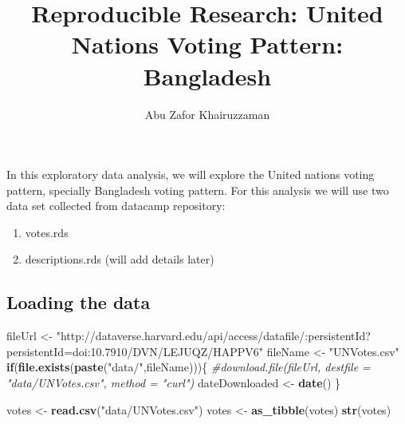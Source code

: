 \documentclass[
]{article}
\title{Reproducible Research: United Nations Voting Pattern: Bangladesh}
\author{Abu Zafor Khairuzzaman}
\date{}
\newenvironment{Shaded}{\begin{snugshade}}{\end{snugshade}}
\newcommand{\CommentTok}[1]{\textcolor[rgb]{0.56,0.35,0.01}{\textit{#1}}}
\newcommand{\ControlFlowTok}[1]{\textcolor[rgb]{0.13,0.29,0.53}{\textbf{#1}}}
\newcommand{\KeywordTok}[1]{\textcolor[rgb]{0.13,0.29,0.53}{\textbf{#1}}}
\newcommand{\NormalTok}[1]{#1}
\newcommand{\StringTok}[1]{\textcolor[rgb]{0.31,0.60,0.02}{#1}}
\providecommand{\tightlist}{%
  \setlength{\itemsep}{0pt}\setlength{\parskip}{0pt}}
\begin{document}
\maketitle

In this exploratory data analysis, we will explore the United nations
voting pattern, specially Bangladesh voting pattern. For this analysis
we will use two data set collected from datacamp repository:

\begin{enumerate}
\def\labelenumi{\arabic{enumi}.}
\tightlist
\item
  votes.rds
\item
  descriptions.rds (will add details later)
\end{enumerate}

\hypertarget{loading-the-data}{%
\subsection{Loading the data}\label{loading-the-data}}

\begin{Shaded}
\begin{Highlighting}[]
\NormalTok{fileUrl <-}\StringTok{ "http://dataverse.harvard.edu/api/access/datafile/:persistentId?persistentId=doi:10.7910/DVN/LEJUQZ/HAPPV6"}
\NormalTok{fileName <-}\StringTok{ "UNVotes.csv"}
\ControlFlowTok{if}\NormalTok{(}\KeywordTok{file.exists}\NormalTok{(}\KeywordTok{paste}\NormalTok{(}\StringTok{"data/"}\NormalTok{,fileName)))\{}
  \CommentTok{#download.file(fileUrl, destfile = "data/UNVotes.csv", method = "curl")}
\NormalTok{  dateDownloaded <-}\StringTok{ }\KeywordTok{date}\NormalTok{()}
\NormalTok{\}}

\NormalTok{votes <-}\StringTok{ }\KeywordTok{read.csv}\NormalTok{(}\StringTok{"data/UNVotes.csv"}\NormalTok{)}
\NormalTok{votes <-}\StringTok{ }\KeywordTok{as_tibble}\NormalTok{(votes)}
\KeywordTok{str}\NormalTok{(votes)}
\end{Highlighting}
\end{Shaded}
\end{document}
